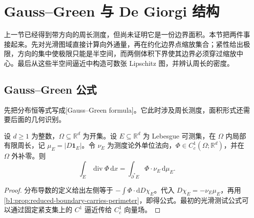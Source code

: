 \section{Gauss–Green 与 De Giorgi 结构}
\label{b1:sec:2705}

上一节已经得到带方向的周长测度，但尚未证明它是一份边界面积。本节把两件事接起来。先对光滑图域直接计算向外通量，再在约化边界点缩放集合；紧性给出极限，方向的集中使极限只能是半空间，而两侧体积下界使其边界必须穿过缩放中心。最后从这些半空间逼近中构造可数张 Lipschitz 图，并辨认周长的密度。


\subsection{Gauss–Green 公式}
\label{b1:subsec:270501}

先把分布恒等式写成[Gauss--Green formula]。它此时涉及周长测度，面积形式还需要后面的几何识别。

\begin{proposition}\label{b1:prop:gauss-green-distributional}
设 \(d\ge1\) 为整数，\(\Omega\subseteq\mathbb R^d\) 为开集。设 \(E\subseteq\mathbb R^d\) 为 Lebesgue 可测集，在 \(\Omega\) 内局部有限周长，记 \(\mu_E=|D\mathbf1_E|\)。令 \(\nu_E\) 为测度论外单位法向，\(\Phi\in C_c^1(\Omega;\mathbb R^d)\)，并在 \(\Omega\) 外补零。则
\begin{equation}\label{b1:eq:gauss-green-perimeter-measure}
 \int_E\operatorname{div}\Phi\,\mathrm dx
 =\int_{\partial^*E}\Phi\cdot\nu_E\,\mathrm d\mu_E.
\end{equation}
\end{proposition}
\begin{proof}
分布导数的定义给出左侧等于 \(-\int\Phi\cdot\mathrm dD\chi_E\)。代入 \(D\chi_E=-\nu_E\mu_E\)，再用\cref{b1:prop:reduced-boundary-carries-perimeter}，即得公式。最初的光滑测试公式可以通过固定紧支集上的 \(C^1\) 逼近传给 \(C_c^1\) 向量场。
\end{proof}

